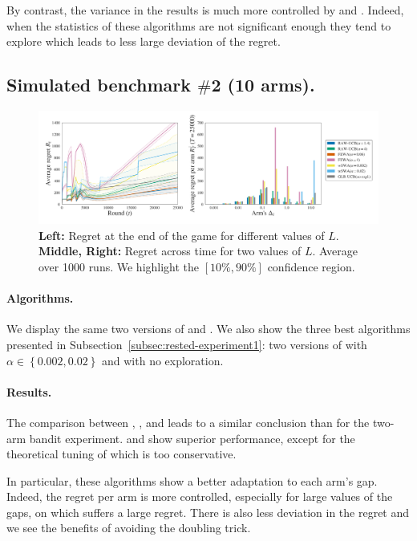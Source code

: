 By contrast, the variance in the results is much more controlled by \RAWUCB and \FEWA. Indeed, when the statistics of these algorithms are not significant enough they tend to explore which leads to less large deviation of the regret. 

\subsection{Simulated benchmark $\#$2 (10 arms).}

\begin{figure}[t]
\centering
\includegraphics[width = 0.99 \textwidth]{2.1Rested/fig/fig2_main.pdf}
\caption{\textbf{Left:} Regret at the end of the game for different values of $L$. \textbf{Middle, Right:} Regret across time for two values of $L$. Average over 1000 runs. We highlight the $\left[10\%, 90\%\right]$ confidence region.}
\label{fig:rested-exp2}
\end{figure}

\paragraph{Algorithms.} We display the same two versions of \FEWA and \RAWUCB. We also show the three best algorithms presented in Subsection~\ref{subsec:rested-experiment1}: two versions of \wSWA with $\alpha\in \left\{0.002, 0.02\right\}$ and \GLRUCB with no exploration. 

\paragraph{Results.}
The comparison between \RAWUCB, \FEWA, and \wSWA leads to a similar conclusion than for the two-arm bandit experiment. \RAWUCB and \FEWA show superior performance, except for the theoretical tuning of \FEWA which is too conservative. 

In particular, these algorithms show a better adaptation to each arm's gap. Indeed, the regret per arm is more controlled, especially for large values of the gaps, on which \wSWA suffers a large regret. There is also less deviation in the regret and we see the benefits of avoiding the doubling trick. 

